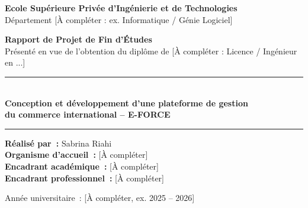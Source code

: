\begin{titlepage}
    \centering


    \vspace{1cm}
    {\large \textbf{Ecole Sup\'erieure Priv\'ee d'Ing\'enierie et de Technologies}}\\[0.3cm]
    {\large D\'epartement [\`A compl\'eter : ex. Informatique / G\'enie Logiciel]}

    \vspace{2cm}
    {\Large \textbf{Rapport de Projet de Fin d'\'Etudes}}\\[0.3cm]
    {\large Pr\'esent\'e en vue de l'obtention du dipl\^ome de [\`A compl\'eter : Licence / Ing\'enieur en ...]}

    \vspace{1.5cm}
    \rule{\linewidth}{0.5mm}\\[0.4cm]
    {\Huge \textbf{Conception et d\'eveloppement d'une plateforme de gestion\\
    du commerce international -- E-FORCE}}\\[0.4cm]
    \rule{\linewidth}{0.5mm}

    \vspace{2cm}
    \begin{flushleft}
        \textbf{R\'ealis\'e par~:} Sabrina Riahi\\[0.3cm]
        \textbf{Organisme d'accueil~:} [\`A compl\'eter]\\[0.3cm]
        \textbf{Encadrant acad\'emique~:} [\`A compl\'eter]\\[0.3cm]
        \textbf{Encadrant professionnel~:} [\`A compl\'eter]
    \end{flushleft}

    \vfill
    {\large Ann\'ee universitaire~: [\`A compl\'eter, ex. 2025 -- 2026]}

\end{titlepage}
